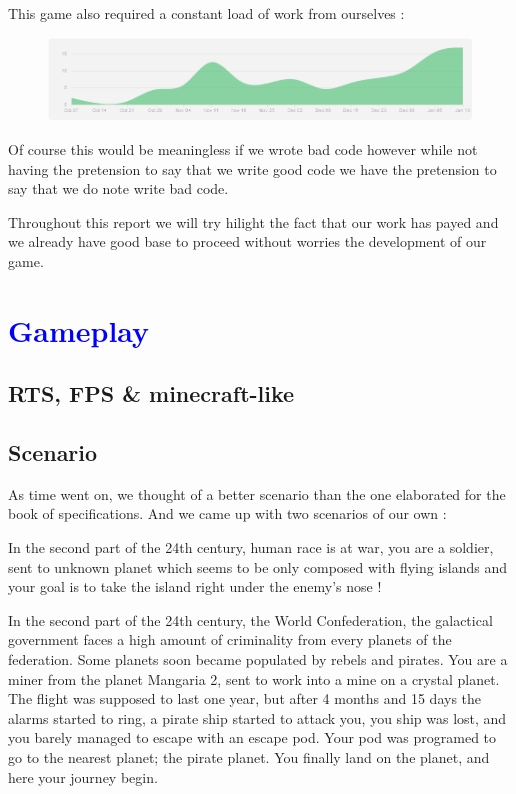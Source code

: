 \documentclass[article]{report} %
\begin{document}
			This game also required a constant load of work from ourselves : 
			\begin{figure}[h]
				\includegraphics[width=18cm]{Images/stats.png}
			\end{figure}

 			Of course this would be meaningless if we wrote bad code however while not having the pretension to say that we write good code we have the pretension to say that  we do note write bad code.

 			Throughout this report we will try hilight the fact that our work has payed and we already have good base to proceed without worries the development of our game.



								
  		\chapter{\textcolor{blue}{Gameplay}}
			\section{RTS, FPS \& minecraft-like}

			\section{Scenario}
				As time went on, we thought of a better scenario than the one elaborated for the book of specifications. 
				And we came up with two scenarios of our own : 

				\begin{description}
					\item In the second part of the 24th century, human race is at war, you are a soldier, sent to unknown planet which seems to be only composed
						with flying islands and your goal is to take the island right under the enemy's nose !
					\item In the second part of the 24th century, the World Confederation, the galactical government faces a high amount of criminality from every planets of the federation. Some planets soon became populated by rebels and pirates. You are a miner from the planet Mangaria 2, sent to work into a mine on a crystal planet. The flight was supposed to last one year, but after 4 months and 15 days the alarms started to ring, a pirate ship started to attack you, you ship was lost, and you barely managed to escape with an escape pod. Your pod was programed to go to the nearest planet; the pirate planet. You finally land on the planet, and here your journey begin. 
				\end{description} 
\end{document}
